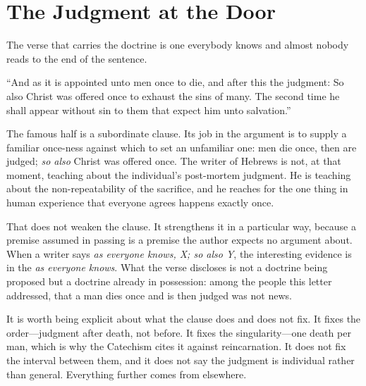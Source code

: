 \section{The Judgment at the Door}

The verse that carries the doctrine is one everybody knows and almost nobody reads to the end of the sentence.

``And as it is appointed unto men once to die, and after this the judgment: So also Christ was offered once to exhaust the sins of many. The second time he shall appear without sin to them that expect him unto salvation.''

The famous half is a subordinate clause. Its job in the argument is to supply a familiar once-ness against which to set an unfamiliar one: men die once, then are judged; \emph{so also} Christ was offered once. The writer of Hebrews is not, at that moment, teaching about the individual's post-mortem judgment. He is teaching about the non-repeatability of the sacrifice, and he reaches for the one thing in human experience that everyone agrees happens exactly once.

That does not weaken the clause. It strengthens it in a particular way, because a premise assumed in passing is a premise the author expects no argument about. When a writer says \emph{as everyone knows, X; so also Y}, the interesting evidence is in the \emph{as everyone knows}. What the verse discloses is not a doctrine being proposed but a doctrine already in possession: among the people this letter addressed, that a man dies once and is then judged was not news.

It is worth being explicit about what the clause does and does not fix. It fixes the order---judgment after death, not before. It fixes the singularity---one death per man, which is why the Catechism cites it against reincarnation. It does not fix the interval between them, and it does not say the judgment is individual rather than general. Everything further comes from elsewhere.

